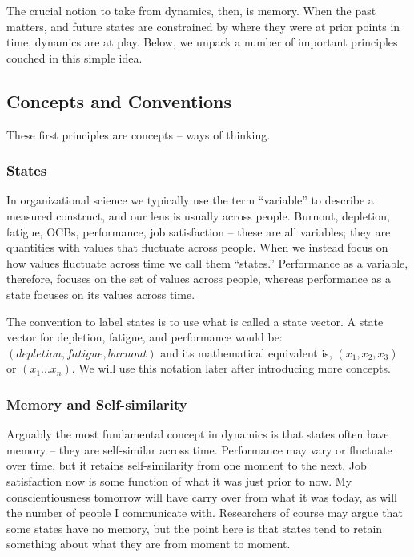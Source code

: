 \documentclass[english,,man]{apa6}
\theoremstyle{definition}
\theoremstyle{definition}
\theoremstyle{definition}
\theoremstyle{remark}
\begin{document}
The crucial notion to take from dynamics, then, is memory. When the past
matters, and future states are constrained by where they were at prior
points in time, dynamics are at play. Below, we unpack a number of
important principles couched in this simple idea.

\hypertarget{concepts-and-conventions}{%
\subsection{Concepts and Conventions}\label{concepts-and-conventions}}

These first principles are concepts -- ways of thinking.

\hypertarget{states}{%
\subsubsection{States}\label{states}}

In organizational science we typically use the term \enquote{variable}
to describe a measured construct, and our lens is usually across people.
Burnout, depletion, fatigue, OCBs, performance, job satisfaction --
these are all variables; they are quantities with values that fluctuate
across people. When we instead focus on how values fluctuate across time
we call them \enquote{states.} Performance as a variable, therefore,
focuses on the set of values across people, whereas performance as a
state focuses on its values across time.

The convention to label states is to use what is called a state vector.
A state vector for depletion, fatigue, and performance would be:
\((depletion, fatigue, burnout)\) and its mathematical equivalent is,
\((x_1, x_2, x_3)\) or \((x_1 ...x_n)\). We will use this notation later
after introducing more concepts.

\hypertarget{memory-and-self-similarity}{%
\subsubsection{Memory and
Self-similarity}\label{memory-and-self-similarity}}

Arguably the most fundamental concept in dynamics is that states often
have memory -- they are self-similar across time. Performance may vary
or fluctuate over time, but it retains self-similarity from one moment
to the next. Job satisfaction now is some function of what it was just
prior to now. My conscientiousness tomorrow will have carry over from
what it was today, as will the number of people I communicate with.
Researchers of course may argue that some states have no memory, but the
point here is that states tend to retain something about what they are
from moment to moment.
\end{document}
